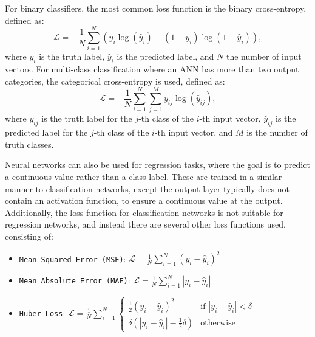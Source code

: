 For binary classifiers, the most common loss function is the binary cross-entropy, defined as:
\begin{equation}
  \mathcal{L} = -\frac{1}{N}\sum_{i=1}^{N} \left( y_{i}\log(\hat{y}_{i}) + (1 - y_{i})\log(1 - \hat{y}_{i}) \right),
\end{equation}
where $y_{i}$ is the truth label, $\hat{y}_{i}$ is the predicted label, and $N$ the number of input vectors. For multi-class classification where an ANN has more than two output categories, the categorical cross-entropy is used, defined as:
\begin{equation}
  \mathcal{L} = -\frac{1}{N}\sum_{i=1}^{N} \sum_{j=1}^{M} y_{ij}\log(\hat{y}_{ij}),
\end{equation}
where $y_{ij}$ is the truth label for the $j$-th class of the $i$-th input vector, $\hat{y}_{ij}$ is the predicted label for the $j$-th class of the $i$-th input vector, and $M$ is the number of truth classes.

Neural networks can also be used for regression tasks, where the goal is to predict a continuous value rather than a class label. These are trained in a similar manner to classification networks, except the output layer typically does not contain an activation function, to ensure a continuous value at the output. Additionally, the loss function for classification networks is not suitable for regression networks, and instead there are several other loss functions used, consisting of:
\begin{itemize}
  \item \texttt{Mean Squared Error (MSE)}: $\mathcal{L} = \frac{1}{N}\sum_{i=1}^{N} (y_{i} - \hat{y}_{i})^{2}$
  \item \texttt{Mean Absolute Error (MAE)}: $\mathcal{L} = \frac{1}{N}\sum_{i=1}^{N} |y_{i} - \hat{y}_{i}|$
  \item \texttt{Huber Loss}: $\mathcal{L} = \frac{1}{N}\sum_{i=1}^{N}
  \begin{cases}
    \frac{1}{2}(y_{i} - \hat{y}_{i})^{2} & \text{if } |y_{i} - \hat{y}_{i}| < \delta \\
    \delta(|y_{i} - \hat{y}_{i}| - \frac{1}{2}\delta) & \text{otherwise}
  \end{cases}$
\end{itemize}

